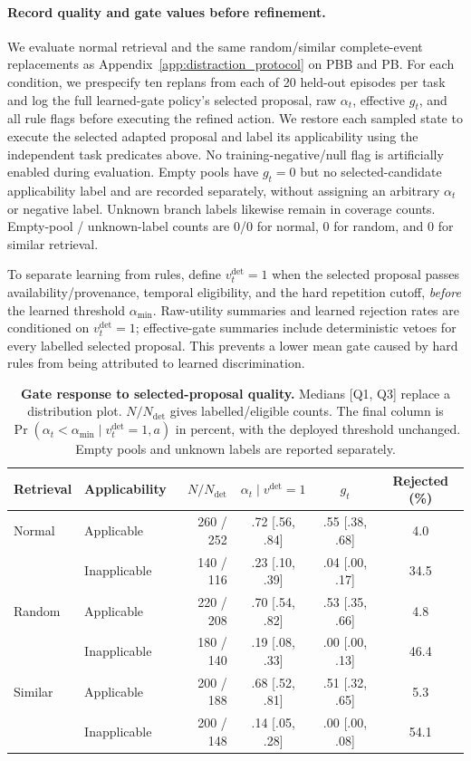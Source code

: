 \paragraph{Record quality and gate values before refinement.}
We evaluate normal retrieval and the same random/similar complete-event replacements as Appendix~\ref{app:distraction_protocol} on PBB and PB.
For each condition, we prespecify ten replans from each of 20 held-out episodes per task and log the full learned-gate policy's selected proposal, raw $\alpha_t$, effective $g_t$, and all rule flags before executing the refined action.
We restore each sampled state to execute the selected adapted proposal and label its applicability using the independent task predicates above.
No training-negative/null flag is artificially enabled during evaluation.
Empty pools have $g_t=0$ but no selected-candidate applicability label and are recorded separately, without assigning an arbitrary $\alpha_t$ or negative label.
Unknown branch labels likewise remain in coverage counts.
Empty-pool / unknown-label counts are 0/0 for normal, 0 for random, and 0 for similar retrieval.

To separate learning from rules, define $v_t^{\mathrm{det}}=1$ when the selected proposal passes availability/provenance, temporal eligibility, and the hard repetition cutoff, \emph{before} the learned threshold $\alpha_{\min}$.
Raw-utility summaries and learned rejection rates are conditioned on $v_t^{\mathrm{det}}=1$; effective-gate summaries include deterministic vetoes for every labelled selected proposal.
This prevents a lower mean gate caused by hard rules from being attributed to learned discrimination.

\begin{table}[H]
\centering\footnotesize
\setlength{\tabcolsep}{3pt}
\caption{\textbf{Gate response to selected-proposal quality.}
Medians [Q1, Q3] replace a distribution plot. $N/N_{\mathrm{det}}$ gives labelled/eligible counts.
The final column is $\Pr(\alpha_t<\alpha_{\min}\mid v_t^{\mathrm{det}}=1,a)$ in percent, with the deployed threshold unchanged.
Empty pools and unknown labels are reported separately.}
\label{tab:rebuttal_gate_quality}
\begin{tabular}{@{}llrccc@{}}
\toprule
Retrieval & Applicability & $N/N_{\mathrm{det}}$ & $\alpha_t\mid v^{\mathrm{det}}=1$ & $g_t$ & Rejected (\%) \\
\midrule
Normal & Applicable & 260 / 252 & .72 [.56, .84] & .55 [.38, .68] & 4.0 \\
 & Inapplicable & 140 / 116 & .23 [.10, .39] & .04 [.00, .17] & 34.5 \\
Random & Applicable & 220 / 208 & .70 [.54, .82] & .53 [.35, .66] & 4.8 \\
 & Inapplicable & 180 / 140 & .19 [.08, .33] & .00 [.00, .13] & 46.4 \\
Similar & Applicable & 200 / 188 & .68 [.52, .81] & .51 [.32, .65] & 5.3 \\
 & Inapplicable & 200 / 148 & .14 [.05, .28] & .00 [.00, .08] & 54.1 \\
\bottomrule
\end{tabular}
\end{table}

